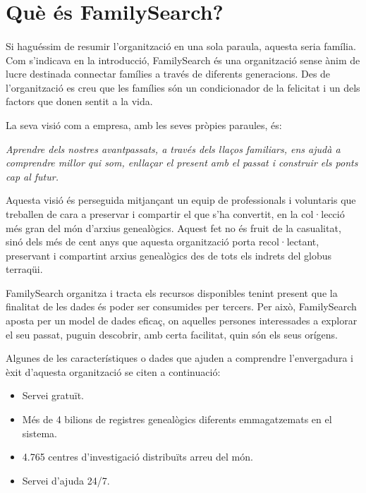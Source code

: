 \section{Què és FamilySearch?}

    \paragraph{}
    Si haguéssim de resumir l’organització en una sola paraula, aquesta seria família. Com s’indicava en la introducció, FamilySearch és una organització sense ànim de lucre destinada connectar famílies a través de diferents generacions. Des de l’organització es creu que les famílies són un condicionador de la felicitat i un dels factors que donen sentit a la vida.

    La seva visió com a empresa, amb les seves pròpies paraules, és:

    \begin{displayquote}
        \emph{Aprendre dels nostres avantpassats, a través dels llaços familiars, ens ajudà a comprendre millor qui som, enllaçar el present amb el passat i construir els ponts cap al futur.}
    \end{displayquote}

    Aquesta visió és perseguida mitjançant un equip de professionals i voluntaris que treballen de cara a preservar i compartir el que s'ha convertit, en la col·lecció més gran del món d'arxius genealògics. Aquest fet no és fruit de la casualitat, sinó dels més de cent anys que aquesta organització porta recol·lectant, preservant i compartint arxius genealògics des de tots els indrets del globus terraqüi.

    FamilySearch organitza i tracta els recursos disponibles tenint present que la finalitat de les dades és poder ser consumides per tercers. Per això, FamilySearch aposta per un model de dades eficaç, on aquelles persones interessades a explorar el seu passat, puguin descobrir, amb certa facilitat, quin són els seus orígens.

    Algunes de les característiques o dades que ajuden a comprendre l'envergadura i èxit d’aquesta organització se citen a continuació:

    \begin{itemize}
        \item Servei gratuït.
        \item Més de 4 bilions de registres genealògics diferents emmagatzemats en el sistema.
        \item 4.765 centres d’investigació distribuïts arreu del món.
        \item Servei d'ajuda 24/7.
    \end{itemize}
